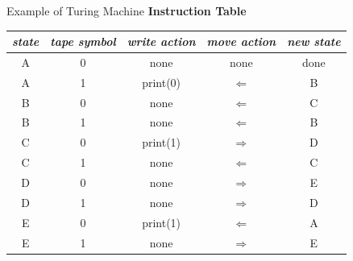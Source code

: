 \documentclass[xcolor={usenames,svgnames,x11names,dvipsnames,table}]{beamer}
\begin{document}
\begin{frame}{Example of Turing Machine}
    \textbf{Instruction Table}
    \begin{center}
        \footnotesize
        \begin{tabular}{cc|ccc}
            \emph{state} & \emph{tape symbol} & \emph{write action} & \emph{move action} & \emph{new state}\\
            \hline
            A            & 0                  & none                & none               & done\\
            A            & 1                  & print(0)            & $\Leftarrow$       & B\\
            B            & 0                  & none                & $\Leftarrow$       & C\\
            B            & 1                  & none                & $\Leftarrow$       & B\\
            C            & 0                  & print(1)            & $\Rightarrow$      & D\\
            C            & 1                  & none                & $\Leftarrow$       & C\\
            D            & 0                  & none                & $\Rightarrow$      & E\\
            D            & 1                  & none                & $\Rightarrow$      & D\\
            E            & 0                  & print(1)            & $\Leftarrow$       & A\\
            E            & 1                  & none                & $\Rightarrow$      & E\\
        \end{tabular}
    \end{center}


\end{frame}
\end{document}
